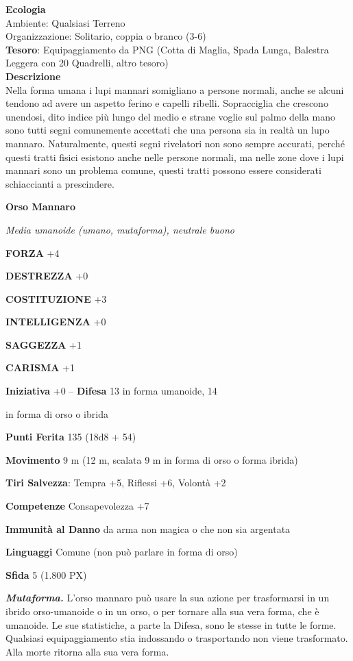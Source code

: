 \begin{multicols}{2}
	\textbf{Ecologia}\\
	Ambiente: Qualsiasi Terreno\\
	Organizzazione: Solitario, coppia o branco (3-6)\\
	\textbf{Tesoro}: Equipaggiamento da PNG (Cotta di Maglia, Spada Lunga, Balestra Leggera con 20 Quadrelli, altro tesoro)\\
	\textbf{Descrizione}\\
	Nella forma umana i lupi mannari somigliano a persone normali, anche se alcuni tendono ad avere un aspetto ferino e capelli ribelli. Sopracciglia che crescono unendosi, dito indice più lungo del medio e strane voglie sul palmo della mano sono tutti segni comunemente accettati che una persona sia in realtà un lupo mannaro. Naturalmente, questi segni rivelatori non sono sempre accurati, perché questi tratti fisici esistono anche nelle persone normali, ma nelle zone dove i lupi mannari sono un problema comune, questi tratti possono essere considerati schiaccianti a prescindere.

	\medskip{}\textbf{Orso Mannaro}

	\textit{Media umanoide (umano, mutaforma), neutrale buono}

	\textbf{FORZA} +4

	\textbf{DESTREZZA} +0

	\textbf{COSTITUZIONE} +3

	\textbf{INTELLIGENZA} +0

	\textbf{SAGGEZZA} +1

	\textbf{CARISMA} +1

	\textbf{Iniziativa} +0 -- \textbf{Difesa} 13 in forma umanoide, 14

	in forma di orso o ibrida

	\textbf{Punti Ferita} 135 (18d8 + 54)

	\textbf{Movimento} 9 m (12 m, scalata 9 m in forma di orso o forma ibrida)

	\textbf{Tiri Salvezza}: Tempra +5, Riflessi +6, Volontà +2

	\textbf{Competenze} Consapevolezza +7

	\textbf{Immunità al Danno} da arma non magica o che non sia argentata

	\textbf{Linguaggi} Comune (non può parlare in forma di orso)

	\textbf{Sfida} 5 (1.800 PX)

	\textit{\textbf{Mutaforma.}} L'orso mannaro può usare la sua azione per trasformarsi in un ibrido orso-umanoide o in un orso, o per tornare alla sua vera forma, che è umanoide. Le sue statistiche, a parte la Difesa, sono le stesse in tutte le forme. Qualsiasi equipaggiamento stia indossando o trasportando non viene trasformato. Alla morte ritorna alla sua vera forma.


\end{multicols}
